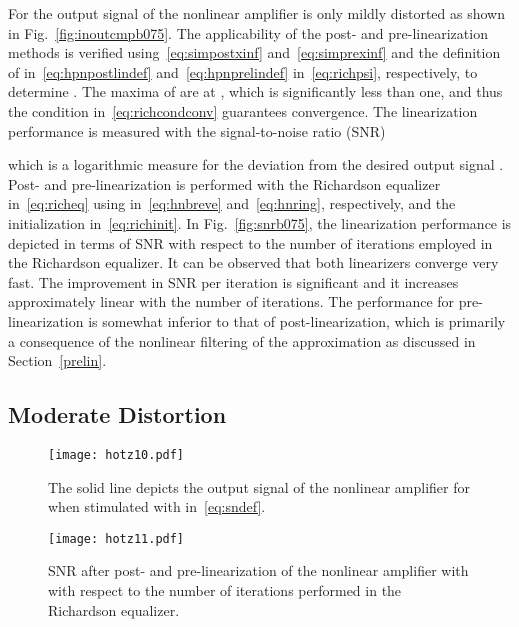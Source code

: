 \documentclass[10pt,twocolumn,twoside]{IEEEtran}
\begin{document}
For  the output signal of the nonlinear amplifier is only
mildly distorted as shown in Fig.~\ref{fig:inoutcmpb075}. The applicability
of the post- and pre-linearization methods is verified
using~\eqref{eq:simpostxinf} and~\eqref{eq:simprexinf} and the definition
of  in~\eqref{eq:hpnpostlindef} and~\eqref{eq:hpnprelindef}
in~\eqref{eq:richpsi}, respectively, to determine .
The maxima of  are at , which is significantly less
than one, and thus the condition in~\eqref{eq:richcondconv} guarantees convergence.
The linearization performance is measured with the signal-to-noise ratio (SNR)

which is a logarithmic measure for the deviation from the desired output signal . 
Post- and pre-linearization is performed with the Richardson equalizer in~\eqref{eq:richeq}
using  in~\eqref{eq:hnbreve} and~\eqref{eq:hnring}, respectively, and the initialization
in~\eqref{eq:richinit}. In Fig.~\ref{fig:snrb075}, the linearization performance is depicted
in terms of SNR with respect to the number of iterations employed in the Richardson
equalizer. It can be observed that both linearizers converge very fast. The improvement in
SNR per iteration is significant and it increases approximately linear with the number of
iterations. The performance for pre-linearization is somewhat inferior to that of
post-linearization, which is primarily a consequence of the nonlinear filtering of the
approximation as discussed in Section~\ref{prelin}.

\subsection{Moderate Distortion}
	\label{results:moderate}

\begin{figure}[!t]\centering \texttt{[image: hotz10.pdf]}\caption{The solid line depicts the output signal of the nonlinear
	amplifier for  when stimulated with  in~\eqref{eq:sndef}.}\label{fig:inoutcmpb1}\end{figure}\begin{figure}[!t]\centering \texttt{[image: hotz11.pdf]}\caption{SNR after post- and pre-linearization of the nonlinear amplifier with 
	with respect to the number of iterations performed in the Richardson equalizer.}\label{fig:snrb1}\end{figure}
\end{document}
